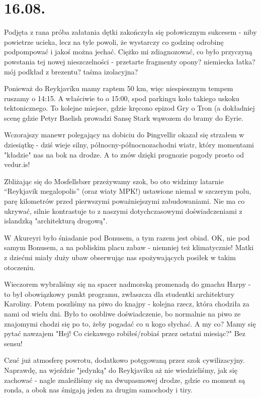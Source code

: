 \chapter{16.08.}

Podjęta z rana próba załatania dętki zakończyła się połowicznym sukcesem - niby powietrze ucieka, lecz na tyle powoli, że wystarczy co godzinę odrobinę podpompować i jakoś można jechać. Ciężko mi zdiagnozować, co było przyczyną powstania tej nowej nieszczelności - przetarte fragmenty opony? niemiecka łatka? mój podkład z brezentu? taśma izolacyjna?

Ponieważ do Reykjavíku mamy raptem 50 km, więc niespiesznym tempem ruszamy o 14:15. A właściwie to o 15:00, spod parkingu koło takiego uskoku tektonicznego. To kolejne miejsce, gdzie kręcono epizod Gry o Tron (a dokładniej scenę gdzie Petyr Baelish prowadzi Sansę Stark wąwozem do bramy do Eyrie.

Wczorajszy manewr polegający na dobiciu do Þingvellir okazał się strzałem w dziesiątkę - dziś wieje silny, północny-północnozachodni wiatr, który momentami "kładzie" nas na bok na drodze. A to znów dzięki prognozie pogody prosto od vedur.is!

Zbliżając się do Mosfellsbær przeżywamy szok, bo oto widzimy latarnie “Reykjavik megalopolis” (oraz wiaty MPK!) ustawione niemal w szczerym polu, parę kilometrów przed pierwszymi poważniejszymi zabudowaniami. Nie ma co ukrywać, silnie kontrastuje to z naszymi dotychczasowymi doświadczeniami z islandzką "architekturą drogową".


W Akureyri było śniadanie pod Bonusem, a tym razem jest obiad. OK, nie pod samym Bonusem, a na pobliskim placu zabaw - niemniej też klimatycznie! Matki z dziećmi miały duży ubaw obserwując nas spożywających posiłek w takim otoczeniu.

Wieczorem wybraliśmy się na spacer nadmorską promenadą do gmachu Harpy - to był obowiązkowy punkt programu, zwłaszcza dla studentki architektury Karoliny. Potem poszliśmy na piwo do knajpy - kolejna rzecz, która chodziła za nami od wielu dni. Było to osobliwe doświadczenie, bo normalnie na piwo ze znajomymi chodzi się po to, żeby pogadać co u kogo słychać. A my co? Mamy się pytać nawzajem "Hej! Co ciekawego robiłeś/robiaś przez ostatni miesiąc?" Bez sensu!

Czuć już atmosferę powrotu, dodatkowo potęgowaną przez szok cywilizacyjny. Naprawdę, na wjeździe "jedynką" do Reykjaviku aż nie wiedzieliśmy, jak się zachować - nagle znaleźliśmy się na dwupasmowej drodze, gdzie co moment są ronda, a obok nas śmigają jeden za drugim samochody i tiry.

